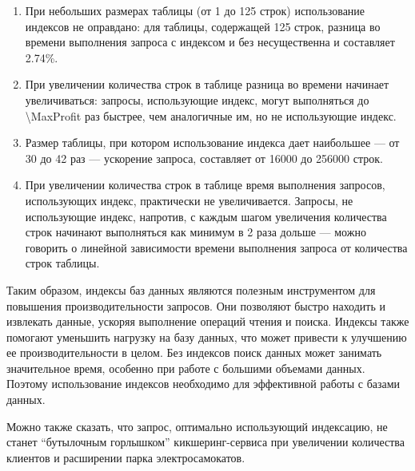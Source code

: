 \begin{enumerate}
    \item При небольших размерах таблицы (от 1 до 125 строк) использование индексов не оправдано: для таблицы, содержащей 125 строк, разница во времени выполнения запроса с индексом и без несущественна и составляет \num{2.74}\%.
    \item При увеличении количества строк в таблице разница во времени начинает увеличиваться: запросы, использующие индекс, могут выполняться до \num[round-precision=0]{\MaxProfit} раз быстрее, чем аналогичные им, но не использующие индекс.
    \item Размер таблицы, при котором использование индекса дает наибольшее --- от 30 до 42 раз --- ускорение запроса, составляет от \num[round-precision=0]{16000} до \num[round-precision=0]{256000} строк.
    \item При увеличении количества строк в таблице время выполнения запросов, использующих индекс, практически не увеличивается. Запросы, не использующие индекс, напротив, с каждым шагом увеличения количества строк начинают выполняться как минимум в 2 раза дольше --- можно говорить о линейной зависимости времени выполнения запроса от количества строк таблицы.
\end{enumerate}

Таким образом, индексы баз данных являются полезным инструментом для повышения производительности запросов. Они позволяют быстро находить и извлекать данные, ускоряя выполнение операций чтения и поиска. Индексы также помогают уменьшить нагрузку на базу данных, что может привести к улучшению ее производительности в целом. Без индексов поиск данных может занимать значительное время, особенно при работе с большими объемами данных. Поэтому использование индексов необходимо для эффективной работы с базами данных.

Можно также сказать, что запрос, оптимально использующий индексацию, не станет \enquote{бутылочным горлышком} кикшеринг-сервиса при увеличении количества клиентов и расширении парка электросамокатов.